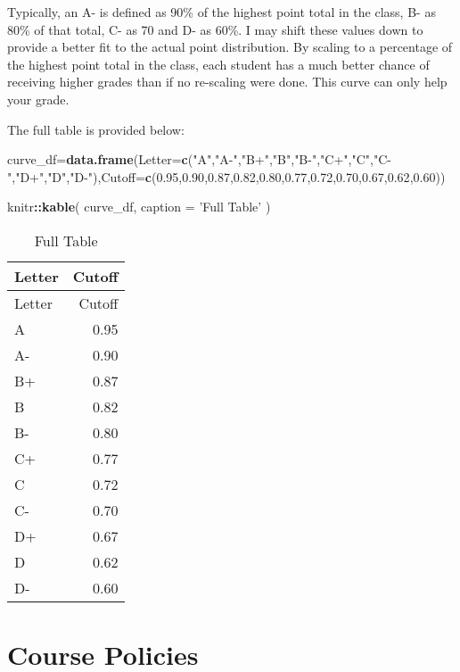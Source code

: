 \documentclass[11pt,]{article}
\newenvironment{Shaded}{\begin{snugshade}}{\end{snugshade}}
\newcommand{\KeywordTok}[1]{\textcolor[rgb]{0.13,0.29,0.53}{\textbf{#1}}}
\newcommand{\DataTypeTok}[1]{\textcolor[rgb]{0.13,0.29,0.53}{#1}}
\newcommand{\FloatTok}[1]{\textcolor[rgb]{0.00,0.00,0.81}{#1}}
\newcommand{\StringTok}[1]{\textcolor[rgb]{0.31,0.60,0.02}{#1}}
\newcommand{\OperatorTok}[1]{\textcolor[rgb]{0.81,0.36,0.00}{\textbf{#1}}}
\newcommand{\NormalTok}[1]{#1}
\begin{document}
Typically, an A- is defined as 90\% of the highest point total in the
class, B- as 80\% of that total, C- as 70 and D- as 60\%. I may shift
these values down to provide a better fit to the actual point
distribution. By scaling to a percentage of the highest point total in
the class, each student has a much better chance of receiving higher
grades than if no re-scaling were done. This curve can only help your
grade.

The full table is provided below:

\begin{Shaded}
\begin{Highlighting}[]
\NormalTok{curve_df=}\KeywordTok{data.frame}\NormalTok{(}\DataTypeTok{Letter=}\KeywordTok{c}\NormalTok{(}\StringTok{"A"}\NormalTok{,}\StringTok{"A-"}\NormalTok{,}\StringTok{"B+"}\NormalTok{,}\StringTok{"B"}\NormalTok{,}\StringTok{"B-"}\NormalTok{,}\StringTok{"C+"}\NormalTok{,}\StringTok{"C"}\NormalTok{,}\StringTok{"C-"}\NormalTok{,}\StringTok{"D+"}\NormalTok{,}\StringTok{"D"}\NormalTok{,}\StringTok{"D-"}\NormalTok{),}\DataTypeTok{Cutoff=}\KeywordTok{c}\NormalTok{(}\FloatTok{0.95}\NormalTok{,}\FloatTok{0.90}\NormalTok{,}\FloatTok{0.87}\NormalTok{,}\FloatTok{0.82}\NormalTok{,}\FloatTok{0.80}\NormalTok{,}\FloatTok{0.77}\NormalTok{,}\FloatTok{0.72}\NormalTok{,}\FloatTok{0.70}\NormalTok{,}\FloatTok{0.67}\NormalTok{,}\FloatTok{0.62}\NormalTok{,}\FloatTok{0.60}\NormalTok{))}

\NormalTok{knitr}\OperatorTok{::}\KeywordTok{kable}\NormalTok{(}
\NormalTok{  curve_df, }\DataTypeTok{caption =} \StringTok{'Full Table'}
\NormalTok{)}
\end{Highlighting}
\end{Shaded}

\begin{longtable}[]{@{}lr@{}}
\caption{Full Table}\tabularnewline
\toprule
Letter & Cutoff\tabularnewline
\midrule
\endfirsthead
\toprule
Letter & Cutoff\tabularnewline
\midrule
\endhead
A & 0.95\tabularnewline
A- & 0.90\tabularnewline
B+ & 0.87\tabularnewline
B & 0.82\tabularnewline
B- & 0.80\tabularnewline
C+ & 0.77\tabularnewline
C & 0.72\tabularnewline
C- & 0.70\tabularnewline
D+ & 0.67\tabularnewline
D & 0.62\tabularnewline
D- & 0.60\tabularnewline
\bottomrule
\end{longtable}

\section{Course Policies}\label{course-policies}
\end{document}
